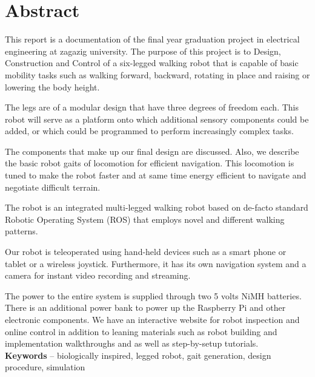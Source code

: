 \chapter*{Abstract}
This report is a documentation of the final year graduation project in electrical engineering at zagazig university. The purpose of this project is to Design, Construction and Control of a six-legged walking robot that is capable of basic mobility tasks such as walking forward, backward, rotating in place and raising or lowering the body height.

The legs are of a modular design that have three degrees of freedom each. This robot will serve as a platform onto which additional sensory components could be added, or which could be programmed to perform increasingly complex tasks.

The components that make up our final design are discussed. Also, we describe the basic robot gaits of locomotion for efficient navigation. This locomotion is tuned to make the robot faster and at same time energy efficient to navigate and negotiate difficult terrain.

The robot is an integrated multi-legged walking robot based on de-facto standard Robotic Operating System (ROS) that employs novel and different walking patterns.

Our robot is teleoperated using hand-held devices such as a smart phone or tablet or a wireless joystick. Furthermore, it has its own navigation system and a camera for instant video recording and streaming.

The power to the entire system is supplied through two 5 volts NiMH batteries. There is an additional power bank to power up the Raspberry Pi and other electronic components. 
We have an interactive website for robot inspection and online control in addition to leaning materials such as robot building and implementation walkthroughs and as well as step-by-setup tutorials.\\


\textbf{Keywords} -- biologically inspired, legged robot, gait generation, design procedure, simulation


